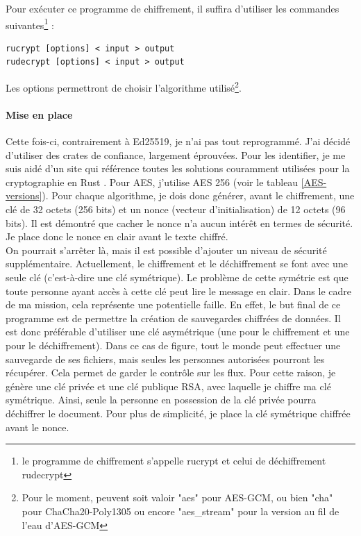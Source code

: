 \documentclass[a4paper, 12pt]{article}
\begin{document}
Pour exécuter ce programme de chiffrement, il suffira d'utiliser les commandes suivantes\footnote{le programme de chiffrement s'appelle rucrypt et celui de déchiffrement rudecrypt} : 
\begin{center}
\begin{minipage}{.63\linewidth}
\begin{lstlisting}[language = shell]
rucrypt [options] < input > output
rudecrypt [options] < input > output
\end{lstlisting}
\end{minipage}
\end{center}
Les options permettront de choisir l'algorithme utilisé\footnote{Pour le moment, peuvent soit valoir "aes" pour AES-GCM, ou bien "cha" pour ChaCha20-Poly1305 ou encore "aes\_stream" pour la version au fil de l'eau d'AES-GCM}.

\paragraph{Mise en place}
Cette fois-ci, contrairement à Ed25519, je n'ai pas tout reprogrammé. J'ai décidé d'utiliser des crates de confiance, largement éprouvées. Pour les identifier, je me suis aidé d'un site qui référence toutes les solutions couramment utilisées pour la cryptographie en Rust \cite{bddrustcrypto}. Pour AES, j'utilise AES 256 (voir le tableau \ref{AES-versions}). Pour chaque algorithme, je dois donc générer, avant le chiffrement, une clé de 32 octets (256 bits) et un nonce (vecteur d'initialisation) de 12 octets (96 bits). Il est démontré que cacher le nonce n'a aucun intérêt en termes de sécurité. Je place donc le nonce en clair avant le texte chiffré. \\

On pourrait s'arrêter là, mais il est possible d'ajouter un niveau de sécurité supplémentaire. Actuellement, le chiffrement et le déchiffrement se font avec une seule clé (c'est-à-dire une clé symétrique). Le problème de cette symétrie est que toute personne ayant accès à cette clé peut lire le message en clair. Dans le cadre de ma mission, cela représente une potentielle faille. En effet, le but final de ce programme est de permettre la création de sauvegardes chiffrées de données. Il est donc préférable d'utiliser une clé asymétrique (une pour le chiffrement et une pour le déchiffrement). Dans ce cas de figure, tout le monde peut effectuer une sauvegarde de ses fichiers, mais seules les personnes autorisées pourront les récupérer. Cela permet de garder le contrôle sur les flux. Pour cette raison, je génère une clé privée et une clé publique RSA, avec laquelle je chiffre ma clé symétrique. Ainsi, seule la personne en possession de la clé privée pourra déchiffrer le document. Pour plus de simplicité, je place la clé symétrique chiffrée avant le nonce.
\end{document}
